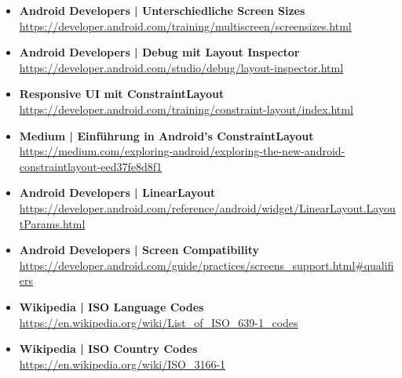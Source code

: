 \documentclass[a4paper]{article}
\begin{document}
{\begin{itemize}
		\item \textbf{Android Developers | Unterschiedliche Screen Sizes}\\
		\href{https://developer.android.com/training/multiscreen/screensizes.html}
		{https://developer.android.com/training/multiscreen/screensizes.html}
		
		\item \textbf{Android Developers | Debug mit Layout Inspector}\\
		\href{https://developer.android.com/studio/debug/layout-inspector.html}
		{https://developer.android.com/studio/debug/layout-inspector.html}
		
		\item \textbf{Responsive UI mit ConstraintLayout}\\
		\href{https://developer.android.com/training/constraint-layout/index.html}
		{https://developer.android.com/training/constraint-layout/index.html}
		
		\item \textbf{Medium | Einführung in Android's ConstraintLayout}\\
		\href{https://medium.com/exploring-android/exploring-the-new-android-constraintlayout-eed37fe8d8f1}
		{https://medium.com/exploring-android/exploring-the-new-android-constraintlayout-eed37fe8d8f1}
		
		\item \textbf{Android Developers | LinearLayout}\\
		\href{https://developer.android.com/reference/android/widget/LinearLayout.LayoutParams.html}
		{https://developer.android.com/reference/android/widget/LinearLayout.LayoutParams.html}
		
		\item \textbf{Android Developers | Screen Compatibility}\\
		\href{https://developer.android.com/guide/practices/screens_support.html#qualifiers}
		{https://developer.android.com/guide/practices/screens\_support.html\#qualifiers}
		
		\item \textbf{Wikipedia | ISO Language Codes}\\
		\href{https://en.wikipedia.org/wiki/List_of_ISO_639-1_codes}
		{https://en.wikipedia.org/wiki/List\_of\_ISO\_639-1\_codes}
		
		\item \textbf{Wikipedia | ISO Country Codes}\\
		\href{https://en.wikipedia.org/wiki/ISO_3166-1}
		{https://en.wikipedia.org/wiki/ISO\_3166-1}
		

\end{itemize}}
\end{document}
